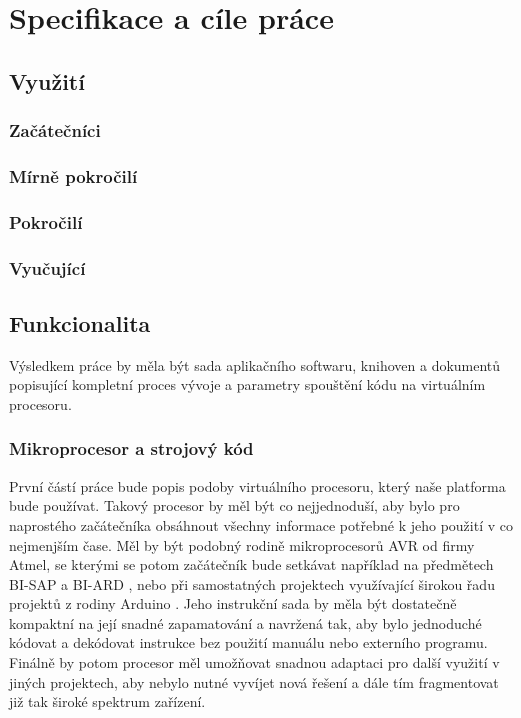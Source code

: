 \chapter{Specifikace a cíle práce}

\blind[2]

\section{Využití}

\blind[1]

\subsection{Začátečníci}

\blind[3]

\subsection{Mírně pokročilí}

\blind[2]

\subsection{Pokročilí}

\blind[1]

\subsection{Vyučující}

\blind[2]

\section{Funkcionalita}

Výsledkem práce by měla být sada aplikačního softwaru, knihoven a dokumentů popisující kompletní proces vývoje a parametry spouštění kódu na virtuálním procesoru.

\subsection{Mikroprocesor a strojový kód}

První částí práce bude popis podoby virtuálního procesoru, který naše platforma bude používat. Takový procesor by měl být co nejjednoduší, aby bylo pro naprostého začátečníka obsáhnout všechny informace potřebné k jeho použití v co nejmenjším čase. Měl by být podobný rodině mikroprocesorů AVR od firmy Atmel, se kterými se potom začátečník bude setkávat například na předmětech BI-SAP a BI-ARD , nebo při samostatných projektech využívající širokou řadu projektů z rodiny Arduino . Jeho instrukční sada by měla být dostatečně kompaktní na její snadné zapamatování a navržená tak, aby bylo jednoduché kódovat a dekódovat instrukce bez použití manuálu nebo externího programu. Finálně by potom procesor měl umožňovat snadnou adaptaci pro další využití v jiných projektech, aby nebylo nutné vyvíjet nová řešení a dále tím fragmentovat již tak široké spektrum zařízení.

